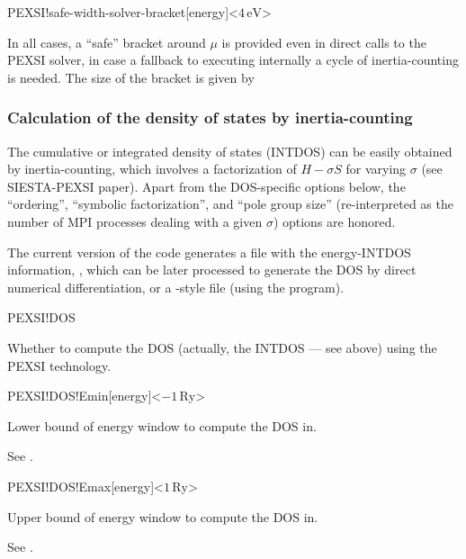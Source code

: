 \begin{fdfentry}{PEXSI!safe-width-solver-bracket}[energy]<$4\,\mathrm{eV}$>

  In all cases, a ``safe'' bracket around $\mu$ is provided even in
  direct calls to the PEXSI solver, in case a fallback to executing
  internally a cycle of inertia-counting is needed. The size of the
  bracket is given by 

\end{fdfentry}

\subsubsection{Calculation of the density of states by
  inertia-counting}
\label{pexsi-dos}

The cumulative or integrated density of states (INTDOS) can be easily
obtained by inertia-counting, which involves a factorization of
$H-\sigma S$ for varying $\sigma$ (see SIESTA-PEXSI paper).  Apart
from the DOS-specific options below, the ``ordering'', ``symbolic
factorization'', and ``pole group size'' (re-interpreted as the number
of MPI processes dealing with a given $\sigma$) options are honored.

The current version of the code generates a file with the
energy-INTDOS information, , which can be later
processed to generate the DOS by direct numerical differentiation, or
a \siesta-style  file (using the 
program).

\begin{fdflogicalF}{PEXSI!DOS}

  Whether to compute the DOS (actually, the INTDOS --- see above)
  using the PEXSI technology.
  
\end{fdflogicalF}

\begin{fdfentry}{PEXSI!DOS!Emin}[energy]<$-1\,\mathrm{Ry}$>

  Lower bound of energy window to compute the DOS in.

  See .

\end{fdfentry}

\begin{fdfentry}{PEXSI!DOS!Emax}[energy]<$1\,\mathrm{Ry}$>

  Upper bound of energy window to compute the DOS in.

  See .

\end{fdfentry}

